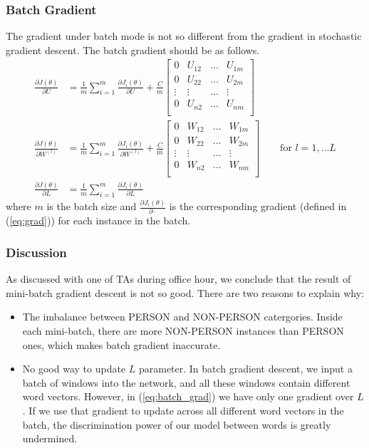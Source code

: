 \documentclass[letterpaper]{article}
\begin{document}
\subsubsection{Batch Gradient}
The gradient under batch mode is not so different from the gradient in stochastic gradient descent. The batch gradient should be as follows.
\begin{equation}\label{eq:batch_grad}
\begin{split}
\frac{\partial J(\theta)}{\partial U} &
= \frac{1}{m} \sum_{i=1}^m \frac{\partial J_i(\theta)}{\partial U}
+ \frac{C}{m}
\begin{bmatrix}
0 & U_{12} & \dots & U_{1m} \\
0 & U_{22} & \dots & U_{2m} \\
\vdots & \vdots & \dots & \vdots  \\
0 & U_{n2} & \dots & U_{nm} \\
\end{bmatrix} \\
\frac{\partial J(\theta)}{\partial W^{(l)}} &
= \frac{1}{m} \sum_{i=1}^m \frac{\partial J_i(\theta)}{\partial W^{(l)}}
+ \frac{C}{m}
\begin{bmatrix}
0 & W_{12} & \dots & W_{1m} \\
0 & W_{22} & \dots & W_{2m} \\
\vdots & \vdots & \dots & \vdots  \\
0 & W_{n2} & \dots & W_{nm} \\
\end{bmatrix}
\qquad \textrm{for } l = 1, \dots L \\
\frac{\partial J(\theta)}{\partial L}
&= \frac{1}{m} \sum_{i=1}^{m} \frac{\partial J_i(\theta)}{\partial L}
\end{split}
\end{equation}
where $m$ is the batch size and $\frac{\partial J_i(\theta)}{\partial \cdot}$ is the corresponding gradient (defined in (\ref{eq:grad})) for each instance in the batch.


\subsubsection{Discussion}
As discussed with one of TAs during office hour, we conclude that the result of mini-batch gradient descent is not so good. There are two reasons to explain why:
\begin{itemize}
\item The imbalance between PERSON and NON-PERSON catergories. Inside each mini-batch, there are more NON-PERSON instances than PERSON ones, which makes batch gradient inaccurate.
\item No good way to update $L$ parameter. In batch gradient descent, we input a batch of windows into the network, and all these windows contain different word vectors. However, in (\ref{eq:batch_grad}) we have only one gradient over $L$. If we use that gradient to update across all different word vectors in the batch, the discrimination power of our model between words is greatly undermined.
\end{itemize}
\end{document}
